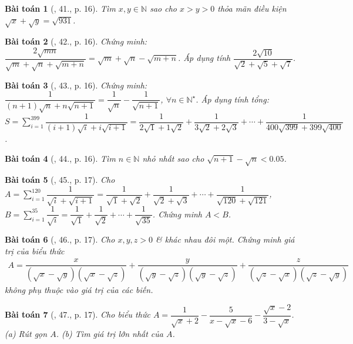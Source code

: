 \documentclass{article}
\newtheorem{baitoan}{Bài toán}
\begin{document}
\begin{baitoan}[\cite{Tuyen_Toan_9}, 41., p. 16]
	Tìm $x,y\in\mathbb{N}$ sao cho $x > y > 0$ thỏa mãn điều kiện $\sqrt{x} + \sqrt{y} = \sqrt{931}$.
\end{baitoan}

\begin{baitoan}[\cite{Tuyen_Toan_9}, 42., p. 16]
	Chứng minh: $\dfrac{2\sqrt{mn}}{\sqrt{m} + \sqrt{n} + \sqrt{m + n}} = \sqrt{m} + \sqrt{n} - \sqrt{m + n}$. Áp dụng tính $\dfrac{2\sqrt{10}}{\sqrt{2} + \sqrt{5} + \sqrt{7}}$.
\end{baitoan}

\begin{baitoan}[\cite{Tuyen_Toan_9}, 43., p. 16]
	Chứng minh: $\dfrac{1}{(n + 1)\sqrt{n} + n\sqrt{n + 1}} = \dfrac{1}{\sqrt{n}} - \dfrac{1}{\sqrt{n + 1}}$, $\forall n\in\mathbb{N}^\star$. Áp dụng tính tổng: $S = \sum_{i=1}^{399} \dfrac{1}{(i + 1)\sqrt{i} + i\sqrt{i + 1}} = \dfrac{1}{2\sqrt{1} + 1\sqrt{2}} + \dfrac{1}{3\sqrt{2} + 2\sqrt{3}} + \cdots + \dfrac{1}{400\sqrt{399} + 399\sqrt{400}}$.
\end{baitoan}

\begin{baitoan}[\cite{Tuyen_Toan_9}, 44., p. 16]
	Tìm $n\in\mathbb{N}$ nhỏ nhất sao cho $\sqrt{n + 1} - \sqrt{n} < 0.05$.
\end{baitoan}

\begin{baitoan}[\cite{Tuyen_Toan_9}, 45., p. 17]
	Cho $A = \sum_{i=1}^{120} \dfrac{1}{\sqrt{i} + \sqrt{i + 1}} = \dfrac{1}{\sqrt{1} + \sqrt{2}} + \dfrac{1}{\sqrt{2} + \sqrt{3}} + \cdots + \dfrac{1}{\sqrt{120} + \sqrt{121}}$, $B = \sum_{i=1}^{35} \dfrac{1}{\sqrt{i}} = \dfrac{1}{\sqrt{1}} + \dfrac{1}{\sqrt{2}} + \cdots + \dfrac{1}{\sqrt{35}}$. Chứng minh $A < B$.
\end{baitoan}

\begin{baitoan}[\cite{Tuyen_Toan_9}, 46., p. 17]
	Cho $x,y,z > 0$ \& khác nhau đôi một. Chứng minh giá trị của biểu thức
	\begin{align*}
		A = \dfrac{x}{(\sqrt{x} - \sqrt{y})(\sqrt{x} - \sqrt{z})} + \dfrac{y}{(\sqrt{y} - \sqrt{z})(\sqrt{y} - \sqrt{z})} + \dfrac{z}{(\sqrt{z} - \sqrt{x})(\sqrt{z} - \sqrt{y})}
	\end{align*}
	không phụ thuộc vào giá trị của các biến.
\end{baitoan}

\begin{baitoan}[\cite{Tuyen_Toan_9}, 47., p. 17]
	Cho biểu thức $A = \dfrac{1}{\sqrt{x} + 2} - \dfrac{5}{x - \sqrt{x} - 6} - \dfrac{\sqrt{x} - 2}{3 - \sqrt{x}}$. (a) Rút gọn $A$. (b) Tìm giá trị lớn nhất của $A$.
\end{baitoan}
\end{document}
